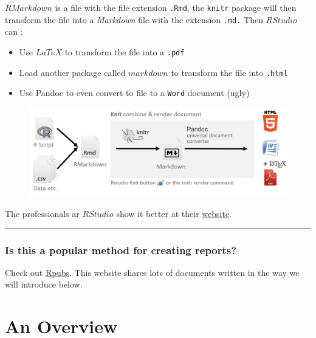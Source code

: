 \documentclass[]{book}
\begin{document}
\(R Markdown\) is a file with the file extension \texttt{.Rmd}, the
\texttt{knitr} package will then transform the file into a
\emph{Markdown} file with the extension \texttt{.md.} Then \(R Studio\)
can \citep{xie2015}:

\begin{itemize}
\item
  Use \(LaTeX\) to transform the file into a \texttt{.pdf}
\item
  Load another package called \(markdown\) to transform the file into
  \texttt{.html}
\item
  Use Pandoc to even convert to file to a \texttt{Word} document (ugly)
\end{itemize}

\begin{figure}
\centering
\includegraphics{images/processRStudio.png}
\caption{}
\end{figure}

The professionals ar \(R Studio\) show it better at their
\href{https://rmarkdown.rstudio.com/index.html}{website}.

\begin{center}\rule{0.5\linewidth}{\linethickness}\end{center}

\subsection*{Is this a popular method for creating
reports?}\label{is-this-a-popular-method-for-creating-reports}

Check out \href{http://rpubs.com/}{Rpubs}. This website shares lots of
documents written in the way we will introduce below.

\chapter{An Overview}\label{an-overview}
\end{document}

